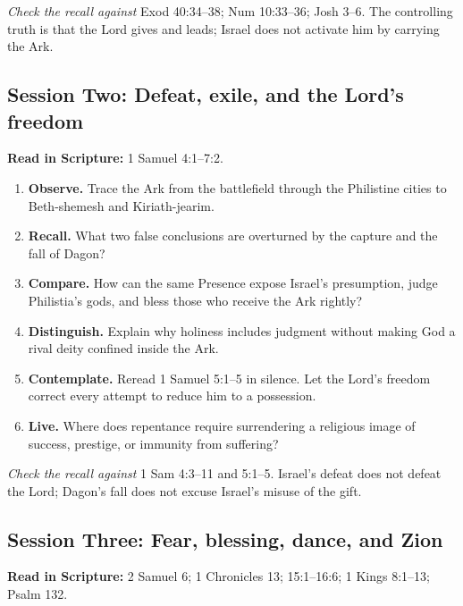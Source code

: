\textit{Check the recall against} Exod 40:34--38; Num 10:33--36; Josh 3--6.
The controlling truth is that the Lord gives and leads; Israel does not
activate him by carrying the Ark.

\subsection{Session Two: Defeat, exile, and the Lord's freedom}

\textbf{Read in Scripture:} 1 Samuel 4:1--7:2.

\begin{enumerate}
  \item \textbf{Observe.} Trace the Ark from the battlefield through the
  Philistine cities to Beth-shemesh and Kiriath-jearim.
  \item \textbf{Recall.} What two false conclusions are overturned by the
  capture and the fall of Dagon?
  \item \textbf{Compare.} How can the same Presence expose Israel's
  presumption, judge Philistia's gods, and bless those who receive the Ark
  rightly?
  \item \textbf{Distinguish.} Explain why holiness includes judgment without
  making God a rival deity confined inside the Ark.
  \item \textbf{Contemplate.} Reread 1 Samuel 5:1--5 in silence.  Let the
  Lord's freedom correct every attempt to reduce him to a possession.
  \item \textbf{Live.} Where does repentance require surrendering a religious
  image of success, prestige, or immunity from suffering?
\end{enumerate}

\textit{Check the recall against} 1 Sam 4:3--11 and 5:1--5.  Israel's defeat
does not defeat the Lord; Dagon's fall does not excuse Israel's misuse of the
gift.

\subsection{Session Three: Fear, blessing, dance, and Zion}

\textbf{Read in Scripture:} 2 Samuel 6; 1 Chronicles 13; 15:1--16:6;
1 Kings 8:1--13; Psalm 132.


